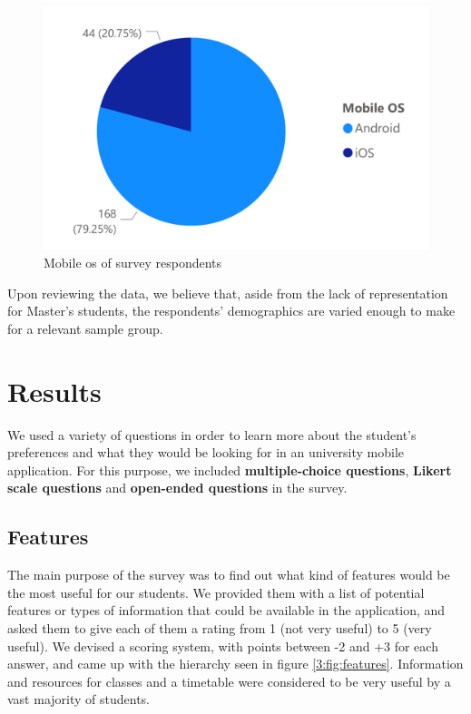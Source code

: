 \begin{figure}[ht]
    \centering
         \includegraphics[height=0.2\textheight]{figures/charts/survey/os.pdf}
    \caption{Mobile \acrshort{os} of survey respondents}
    \label{3:fig:os}
\end{figure}

Upon reviewing the data, we believe that, aside from the lack of representation for Master's students, the respondents' demographics are varied enough to make for a relevant sample group.

\section{Results} \label{3:results}

We used a variety of questions in order to learn more about the student's preferences and what they would be looking for in an university mobile application. For this purpose, we included \textbf{multiple-choice questions}, \textbf{Likert scale questions} and \textbf{open-ended questions} in the survey.

\subsection{Features} \label{3:features}

The main purpose of the survey was to find out what kind of features would be the most useful for our students. We provided them with a list of potential features or types of information that could be available in the application, and asked them to give each of them a rating from 1 (not very useful) to 5 (very useful). We devised a scoring system, with points between -2 and +3 for each answer, and came up with the hierarchy seen in figure \ref{3:fig:features}. Information and resources for classes and a timetable were considered to be very useful by a vast majority of students.

